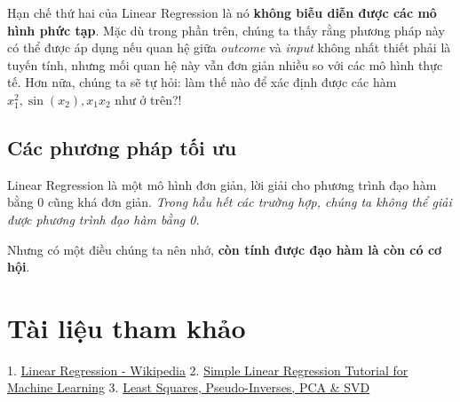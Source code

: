 Hạn chế thứ hai của Linear Regression là nó \textbf{không biễu diễn được các mô hình phức tạp}. Mặc dù trong phần trên, chúng ta thấy rằng phương pháp này có thể được áp dụng nếu quan hệ giữa \textit{outcome} và \textit{input} không nhất thiết phải là tuyến tính, nhưng mối quan hệ này vẫn đơn giản nhiều so với các mô hình thực tế. Hơn nữa, chúng ta sẽ tự hỏi: làm thế nào để xác định được các hàm $x_1^2, \sin(x_2), x_1x_2$ như ở trên?! 
 
 
\subsection{Các phương pháp tối ưu}
Linear Regression là một mô hình đơn giản, lời giải cho phương trình đạo hàm bằng 0 cũng khá đơn giản. \textit{Trong hầu hết các trường hợp, chúng ta không thể giải được phương trình đạo hàm bằng 0.} 
 
Nhưng có một điều chúng ta nên nhớ, \textbf{còn tính được đạo hàm là còn có cơ hội}. 
 
 
 
 
\section{Tài liệu tham khảo}
 
1. \href{https://en.wikipedia.org/wiki/Linear_regression}{Linear Regression - Wikipedia} 
2. \href{http://machinelearningmastery.com/simple-linear-regression-tutorial-for-machine-learning/}{Simple Linear Regression Tutorial for Machine Learning} 
3. \href{http://www.sci.utah.edu/~gerig/CS6640-F2012/Materials/pseudoinverse-cis61009sl10.pdf}{Least Squares, Pseudo-Inverses, PCA \& SVD} 
